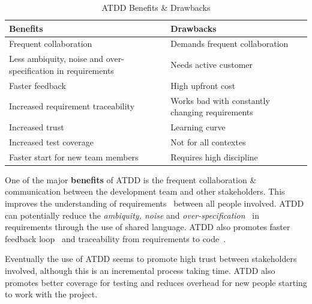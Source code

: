     \begin{table}[H]
        \begin{center}
            \begin{tabular}{ | p{6.3cm} | p{6.3cm} |}
            \hline
            \textbf{Benefits} & \textbf{Drawbacks} \\ \hline
            Frequent collaboration~\cite{haugset2012automated} & Demands frequent collaboration~\cite{haugset2012automated}  \\ \hline
            Less ambiquity, noise and over-specification in requirements~\cite{haugset2012automated} & Needs active customer~\cite{haugset2012automated}  \\ \hline
            Faster feedback~\cite{haugset2012automated} & High upfront cost~\cite{haugset2012automated}  \\ \hline
            Increased requirement traceability~\cite{hayes2009towards} & Works bad with constantly changing requirements~\cite{haugset2012automated}  \\ \hline
            Increased trust~\cite{haugset2012automated} & Learning curve~\cite{haugset2012automated} \\ \hline
            Increased test coverage~\cite{haugset2012automated} & Not for all contextes~\cite{haugset2012automated}  \\ \hline
            Faster start for new team members~\cite{haugset2012automated} & Requires high discipline~\cite{haugset2012automated}  \\ \hline
            \end{tabular}
            \caption {ATDD Benefits \& Drawbacks} \label{tab:atdd-title}
        \end{center}
    \end{table}
    One of the major \textbf{benefits} of ATDD is the frequent collaboration \& communication between
    the development team and other stakeholders. This improves the understanding of requirements~\cite{haugset2012automated}
    between all people involved. ATDD can potentially reduce the \textit{ambiquity, noise} and \textit{over-specification}~\cite{haugset2012automated}
    in requirements through the use of shared language. ATDD also promotes faster feedback loop~\cite{haugset2012automated} and traceability from requirements
    to code~\cite{hayes2009towards}.

    Eventually the use of ATDD seems to promote high trust between stakeholders involved, although
    this is an incremental process taking time. ATDD also promotes better coverage for testing
    and reduces overhead for new people starting to work with the project. ~\cite{haugset2012automated}

